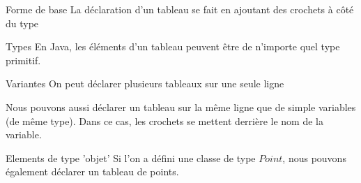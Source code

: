 \begin{frame}{Forme de base}
    La déclaration d'un tableau se fait en ajoutant des crochets à côté du type
    

    \begin{exampleblock}{Types}
        En Java, les éléments d'un tableau peuvent être de n'importe quel type primitif.
    \end{exampleblock}

    

\end{frame}

\begin{frame}{Variantes}
    On peut déclarer plusieurs tableaux sur une seule ligne
    
    Nous pouvons aussi déclarer un tableau sur la même ligne que de simple variables (de même type).
    Dans ce cas, les crochets se mettent derrière le nom de la variable.
    
\end{frame}

\begin{frame}{Elements de type 'objet'}
    Si l'on a défini une classe de type $Point$, nous pouvons également déclarer un tableau de points.

    
\end{frame}